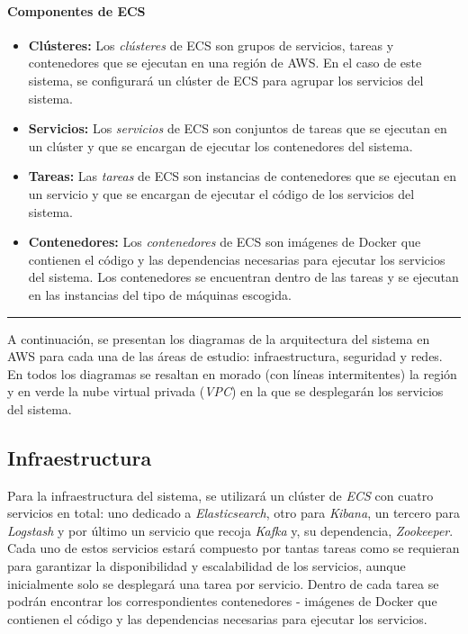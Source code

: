\newpage{}
\paragraph{Componentes de ECS}
\begin{itemize}
	\item \textbf{Clústeres:} Los \textit{clústeres} de ECS son grupos de
		servicios, tareas y contenedores que se ejecutan en una región de AWS.
		En el caso de este sistema, se configurará un clúster de ECS para
		agrupar los servicios del sistema.
	\item \textbf{Servicios:} Los \textit{servicios} de ECS son conjuntos de
		tareas que se ejecutan en un clúster y que se encargan de ejecutar los
		contenedores del sistema.
	\item \textbf{Tareas:} Las \textit{tareas} de ECS son instancias de
		contenedores que se ejecutan en un servicio y que se encargan de
		ejecutar el código de los servicios del sistema.
	\item \textbf{Contenedores:} Los \textit{contenedores} de ECS son imágenes
		de Docker que contienen el código y las dependencias necesarias para
		ejecutar los servicios del sistema. Los contenedores se encuentran
		dentro de las tareas y se ejecutan en las instancias del tipo de
		máquinas escogida.
\end{itemize}

\noindent\rule{14cm}{0.4pt}

A continuación, se presentan los diagramas de la arquitectura del sistema en AWS
para cada una de las áreas de estudio: infraestructura, seguridad y redes. En
todos los diagramas se resaltan en morado (con líneas intermitentes) la región y
en verde la nube virtual privada (\textit{VPC}) en la que se desplegarán los
servicios del sistema.


\newpage{}
\subsection{Infraestructura}\label{subsec:infra}
Para la infraestructura del sistema, se utilizará un clúster de \textit{ECS} con
cuatro servicios en total: uno dedicado a \textit{Elasticsearch}, otro para
\textit{Kibana}, un tercero para \textit{Logstash} y por último un servicio que
recoja \textit{Kafka} y, su dependencia, \textit{Zookeeper}. Cada uno de estos
servicios estará compuesto por tantas tareas como se requieran para garantizar
la disponibilidad y escalabilidad de los servicios, aunque inicialmente solo se
desplegará una tarea por servicio. Dentro de cada tarea se podrán encontrar los
correspondientes contenedores - imágenes de Docker que contienen el código y las
dependencias necesarias para ejecutar los servicios.

